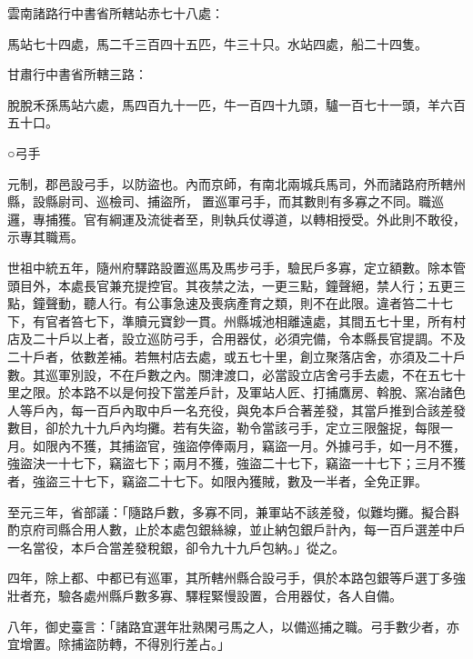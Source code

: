 \begin{pinyinscope}
 雲南諸路行中書省所轄站赤七十八處：



 馬站七十四處，馬二千三百四十五匹，牛三十只。水站四處，船二十四隻。



 甘肅行中書省所轄三路：



 脫脫禾孫馬站六處，馬四百九十一匹，牛一百四十九頭，驢一百七十一頭，羊六百五十口。



 ○弓手



 元制，郡邑設弓手，以防盜也。內而京師，有南北兩城兵馬司，外而諸路府所轄州縣，設縣尉司、巡檢司、捕盜所，置巡軍弓手，而其數則有多寡之不同。職巡邏，專捕獲。官有綱運及流徙者至，則執兵仗導道，以轉相授受。外此則不敢役，示專其職焉。



 世祖中統五年，隨州府驛路設置巡馬及馬步弓手，驗民戶多寡，定立額數。除本管頭目外，本處長官兼充提控官。其夜禁之法，一更三點，鐘聲絕，禁人行；五更三點，鐘聲動，聽人行。有公事急速及喪病產育之類，則不在此限。違者笞二十七下，有官者笞七下，準贖元寶鈔一貫。州縣城池相離遠處，其間五七十里，所有村店及二十戶以上者，設立巡防弓手，合用器仗，必須完備，令本縣長官提調。不及二十戶者，依數差補。若無村店去處，或五七十里，創立聚落店舍，亦須及二十戶數。其巡軍別設，不在戶數之內。關津渡口，必當設立店舍弓手去處，不在五七十里之限。於本路不以是何投下當差戶計，及軍站人匠、打捕鷹房、斡脫、窯冶諸色人等戶內，每一百戶內取中戶一名充役，與免本戶合著差發，其當戶推到合該差發數目，卻於九十九戶內均攤。若有失盜，勒令當該弓手，定立三限盤捉，每限一月。如限內不獲，其捕盜官，強盜停俸兩月，竊盜一月。外據弓手，如一月不獲，強盜決一十七下，竊盜七下；兩月不獲，強盜二十七下，竊盜一十七下；三月不獲者，強盜三十七下，竊盜二十七下。如限內獲賊，數及一半者，全免正罪。



 至元三年，省部議：「隨路戶數，多寡不同，兼軍站不該差發，似難均攤。擬合斟酌京府司縣合用人數，止於本處包銀絲線，並止納包銀戶計內，每一百戶選差中戶一名當役，本戶合當差發稅銀，卻令九十九戶包納。」從之。



 四年，除上都、中都已有巡軍，其所轄州縣合設弓手，俱於本路包銀等戶選丁多強壯者充，驗各處州縣戶數多寡、驛程緊慢設置，合用器仗，各人自備。



 八年，御史臺言：「諸路宜選年壯熟閑弓馬之人，以備巡捕之職。弓手數少者，亦宜增置。除捕盜防轉，不得別行差占。」




\end{pinyinscope}
